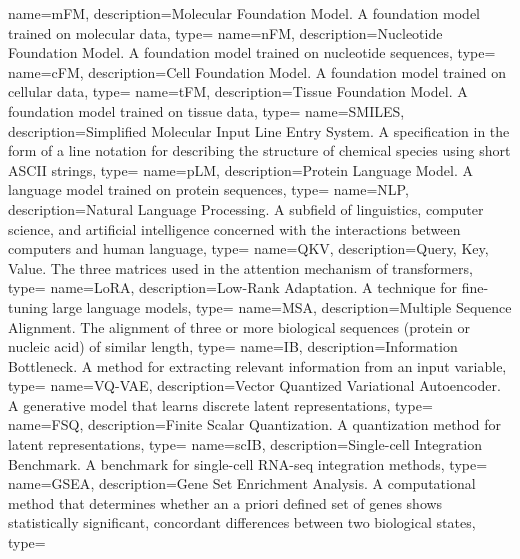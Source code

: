 {
    name={mFM},
    description={Molecular Foundation Model. A foundation model trained on molecular data},
    type=\acronymtype
}
{
    name={nFM},
    description={Nucleotide Foundation Model. A foundation model trained on nucleotide sequences},
    type=\acronymtype
}
{
    name={cFM},
    description={Cell Foundation Model. A foundation model trained on cellular data},
    type=\acronymtype
}
{
    name={tFM},
    description={Tissue Foundation Model. A foundation model trained on tissue data},
    type=\acronymtype
}
{
    name={SMILES},
    description={Simplified Molecular Input Line Entry System. A specification in the form of a line notation for describing the structure of chemical species using short ASCII strings},
    type=\acronymtype
}
{
    name={pLM},
    description={Protein Language Model. A language model trained on protein sequences},
    type=\acronymtype
}
{
    name={NLP},
    description={Natural Language Processing. A subfield of linguistics, computer science, and artificial intelligence concerned with the interactions between computers and human language},
    type=\acronymtype
}
{
    name={QKV},
    description={Query, Key, Value. The three matrices used in the attention mechanism of transformers},
    type=\acronymtype
}
{
    name={LoRA},
    description={Low-Rank Adaptation. A technique for fine-tuning large language models},
    type=\acronymtype
}
{
    name={MSA},
    description={Multiple Sequence Alignment. The alignment of three or more biological sequences (protein or nucleic acid) of similar length},
    type=\acronymtype
}
{
    name={IB},
    description={Information Bottleneck. A method for extracting relevant information from an input variable},
    type=\acronymtype
}
{
    name={VQ-VAE},
    description={Vector Quantized Variational Autoencoder. A generative model that learns discrete latent representations},
    type=\acronymtype
}
{
    name={FSQ},
    description={Finite Scalar Quantization. A quantization method for latent representations},
    type=\acronymtype
}
{
    name={scIB},
    description={Single-cell Integration Benchmark. A benchmark for single-cell RNA-seq integration methods},
    type=\acronymtype
}
{
    name={GSEA},
    description={Gene Set Enrichment Analysis. A computational method that determines whether an a priori defined set of genes shows statistically significant, concordant differences between two biological states},
    type=\acronymtype
}
